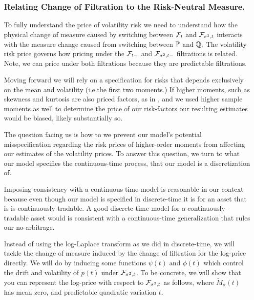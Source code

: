 \documentclass[11pt, letterpaper, twoside, final]{article}
\begin{document}
\subsubsection{Relating Change of Filtration to the Risk-Neutral Measure.}

To fully understand the price of volatility risk we need to understand how the physical change of measure
caused  by switching between $\mathcal{F}_t$ and $\mathcal{F}_{\sigma^2,t}$ interacts with the measure change caused from switching
between $\mathbb{P}$ and $\mathbb{Q}$.
The volatility risk price governs how pricing under the $\mathcal{F}_{t-}$ and $\mathcal{F}_{\sigma^2,t-}$ filtrations is related.
Note, we can price under both filtrations because they are predictable filtrations.

Moving forward we will rely on a  specification for risks that depends exclusively on the mean and volatility
(i.e.\@ the first two moments.)
If higher moments, such as skewness and kurtosis are also priced factors, as in \textcites{harvey2000conditional,
conrad2012exante, chang2013market},  and we used higher sample moments as well to determine the price of our
risk-factors our resulting estimates would be biased, likely substantially so. 

The question facing us is how to we prevent our model's potential misspecification regarding the risk prices of
higher-order moments from affecting our estimates of the volatility prices.
To answer this question, we turn to what our model specifies the continuous-time process, that our model is a
discretization of.

Imposing consistency with a continuous-time model is reasonable in our context because even though our model is
specified in discrete-time it is for an asset that is is continuously tradable.
A good discrete-time model for a continuously-tradable asset would is consistent with a continuous-time
generalization that rules our no-arbitrage.

Instead of using the log-Laplace transform as we did in discrete-time, we will tackle the change of measure
induced by the change of filtration for the log-price directly.
We will do by inducing some functions $\psi(t)$ and $\phi(t)$ which control the drift and volatility of $p(t)$
under $\mathcal{F}_{\sigma^2,t}$.
To be concrete, we will show that you can represent the log-price with respect to $\mathcal{F}_{\sigma^2,t}$ as follows,
where $\widetilde{M}_{\sigma}(t)$ has mean zero, and predictable quadratic variation  $t$.
\end{document}

